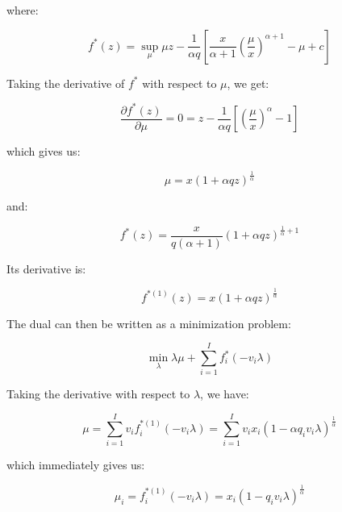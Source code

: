\documentclass{tex/note}
\begin{document}
where:

\begin{equation*}
f^* \left( z \right) = \sup_{\mu} \mu z - \frac{1}{\alpha q} \left[ \frac{x}{\alpha + 1} \left( \frac{\mu}{x} \right) ^{\alpha + 1} - \mu + c \right]
\end{equation*}

Taking the derivative of $f^*$ with respect to $\mu$, we get:

\begin{equation*}
\frac{\partial f^* \left( z \right)}{\partial \mu} = 0 = z - \frac{1}{\alpha q} \left[ \left( \frac{\mu}{x} \right) ^{\alpha} - 1\right]
\end{equation*}

which gives us:

\begin{equation*}
\mu = x \left( 1 + \alpha q z \right)^{\frac{1}{\alpha}}
\end{equation*}

and:

\begin{equation*}
f^* \left( z \right) = \frac{x}{q \left( \alpha + 1 \right)} \left( 1 + \alpha q z \right)^{\frac{1}{\alpha} + 1}
\end{equation*}

Its derivative is:

\begin{equation*}
f^{* \left( 1 \right)} \left( z \right) = x \left( 1 + \alpha q z \right)^{\frac{1}{\alpha}}
\end{equation*}

The dual can then be written as a minimization problem:

\begin{equation*}
\min_\lambda \lambda \mu + \sum_{i = 1}^I f_i^* \left( - v_i \lambda \right)
\end{equation*}

Taking the derivative with respect to $\lambda$, we have:

\begin{equation*}
\mu = \sum_{i = 1}^I v_i f_i^{* \left( 1 \right)} \left( - v_i \lambda \right) = \sum_{i = 1}^I v_i x_i \left( 1 - \alpha q_i v_i \lambda \right)^{\frac{1}{\alpha}}
\end{equation*}

which immediately gives us:

\begin{equation*}
\mu_i = f_i^{* \left( 1 \right)} \left( - v_i \lambda \right) = x_i \left( 1 - q_i v_i \lambda \right)^{\frac{1}{\alpha}}
\end{equation*}
\end{document}
